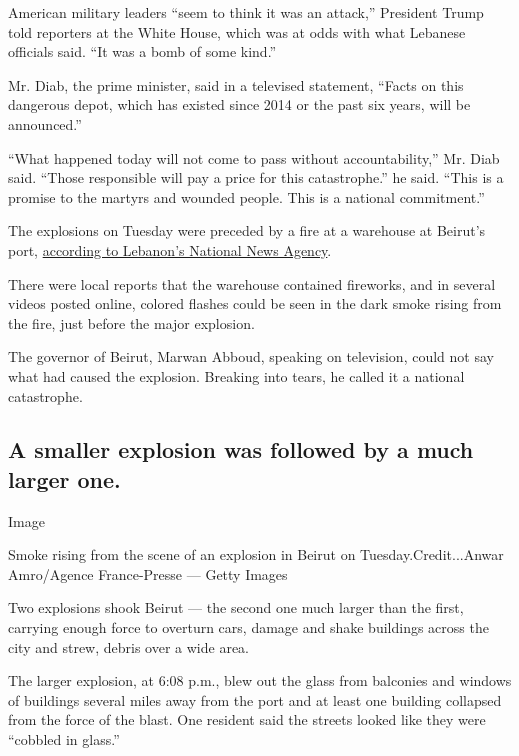 American military leaders ``seem to think it was an attack,'' President
Trump told reporters at the White House, which was at odds with what
Lebanese officials said. ``It was a bomb of some kind.''

Mr. Diab, the prime minister, said in a televised statement, ``Facts on
this dangerous depot, which has existed since 2014 or the past six
years, will be announced.''

``What happened today will not come to pass without accountability,''
Mr. Diab said. ``Those responsible will pay a price for this
catastrophe.'' he said. ``This is a promise to the martyrs and wounded
people. This is a national commitment.''

The explosions on Tuesday were preceded by a fire at a warehouse at
Beirut's port,
\href{http://nna-leb.gov.lb/en/show-news/118492/Fire-breaks-out-in-warehouse-at-Port-of-Beirut-causes-major-explosion}{according
to Lebanon's National News Agency}.

There were local reports that the warehouse contained fireworks, and in
several videos posted online, colored flashes could be seen in the dark
smoke rising from the fire, just before the major explosion.

The governor of Beirut, Marwan Abboud, speaking on television, could not
say what had caused the explosion. Breaking into tears, he called it a
national catastrophe.

\hypertarget{a-smaller-explosion-was-followed-by-a-much-larger-one}{%
\subsection{A smaller explosion was followed by a much larger
one.}\label{a-smaller-explosion-was-followed-by-a-much-larger-one}}

Image

Smoke rising from the scene of an explosion in Beirut on
Tuesday.Credit...Anwar Amro/Agence France-Presse --- Getty Images

Two explosions shook Beirut --- the second one much larger than the
first, carrying enough force to overturn cars, damage and shake
buildings across the city and strew, debris over a wide area.

The larger explosion, at 6:08 p.m., blew out the glass from balconies
and windows of buildings several miles away from the port and at least
one building collapsed from the force of the blast. One resident said
the streets looked like they were ``cobbled in glass.''

